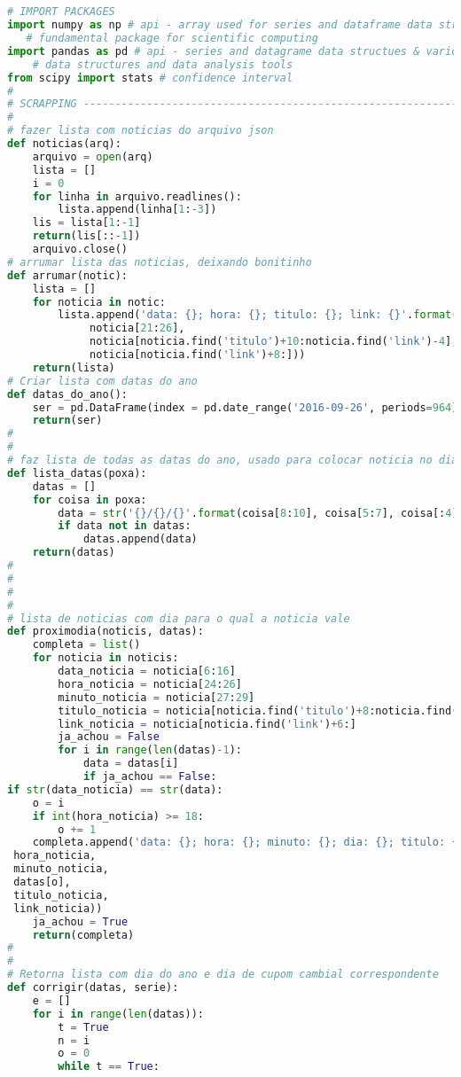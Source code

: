 \begin{lstlisting}[language=Python]


# IMPORT PACKAGES
import numpy as np # api - array used for series and dataframe data structures
   # fundamental package for scientific computing
import pandas as pd # api - series and datagrame data structues & various 
    # data structures and data analysis tools
from scipy import stats # confidence interval
#
# SCRAPPING --------------------------------------------------------------------
#
# fazer lista com noticias do arquivo json
def noticias(arq):
    arquivo = open(arq)
    lista = []
    i = 0
    for linha in arquivo.readlines():
        lista.append(linha[1:-3])
    lis = lista[1:-1]
    return(lis[::-1])
    arquivo.close()
# arrumar lista das noticias, deixando bonitinho
def arrumar(notic):
    lista = []
    for noticia in notic:
        lista.append('data: {}; hora: {}; titulo: {}; link: {}'.format(noticia[10:20],
             noticia[21:26],
             noticia[noticia.find('titulo')+10:noticia.find('link')-4],
             noticia[noticia.find('link')+8:]))
    return(lista)
# Criar lista com datas do ano
def datas_do_ano():
    ser = pd.DataFrame(index = pd.date_range('2016-09-26', periods=964))
    return(ser)
#
#
# faz lista de todas as datas do ano, usado para colocar noticia no dia seguinte
def lista_datas(poxa):
    datas = []
    for coisa in poxa:
        data = str('{}/{}/{}'.format(coisa[8:10], coisa[5:7], coisa[:4]))
        if data not in datas:
            datas.append(data)
    return(datas)
#
#
#
#
# lista de noticias com dia para o qual a noticia vale
def proximodia(noticis, datas):
    completa = list()
    for noticia in noticis:
        data_noticia = noticia[6:16]
        hora_noticia = noticia[24:26]
        minuto_noticia = noticia[27:29]
        titulo_noticia = noticia[noticia.find('titulo')+8:noticia.find('link')-2]
        link_noticia = noticia[noticia.find('link')+6:]
        ja_achou = False
        for i in range(len(datas)-1):
            data = datas[i]
            if ja_achou == False:
if str(data_noticia) == str(data):
    o = i
    if int(hora_noticia) >= 18:
        o += 1
    completa.append('data: {}; hora: {}; minuto: {}; dia: {}; titulo: {}; link: {}'.format(data_noticia,
 hora_noticia,
 minuto_noticia,
 datas[o],
 titulo_noticia,
 link_noticia))
    ja_achou = True
    return(completa)
#
#
# Retorna lista com dia do ano e dia de cupom cambial correspondente
def corrigir(datas, serie):
    e = []
    for i in range(len(datas)):
        t = True
        n = i
        o = 0
        while t == True:

\end{lstlisting}
